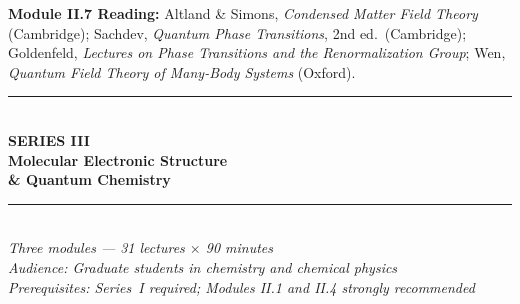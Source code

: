 \documentclass[11pt,a4paper]{article}
\begin{document}
\begin{tcolorbox}[highlightbox]
\textbf{Module II.7 Reading:}
Altland \& Simons, \textit{Condensed Matter Field Theory} (Cambridge);
Sachdev, \textit{Quantum Phase Transitions}, 2nd ed.\ (Cambridge);
Goldenfeld, \textit{Lectures on Phase Transitions and the Renormalization Group};
Wen, \textit{Quantum Field Theory of Many-Body Systems} (Oxford).
\end{tcolorbox}

\newpage

\newpage
\thispagestyle{empty}
\pagecolor{darkblue}
\color{white}
\vspace*{2.2cm}
\begin{center}
  {\color{accentgold}\rule{11cm}{1.5pt}}\\[0.5cm]
  {\fontsize{11}{14}\selectfont\bfseries\color{accentgold}\MakeUppercase{Series III}}\\[0.3cm]
  {\fontsize{22}{28}\selectfont\bfseries Molecular Electronic Structure}\\[0.2cm]
  {\fontsize{22}{28}\selectfont\bfseries \& Quantum Chemistry}\\[0.4cm]
  {\color{accentgold}\rule{11cm}{1.5pt}}\\[1.0cm]
  {\large\itshape Three modules --- 31 lectures $\times$ 90 minutes}\\[0.5cm]
  {\normalsize\itshape Audience: Graduate students in chemistry and chemical physics}\\[0.3cm]
  {\normalsize\itshape Prerequisites: Series~I required; Modules II.1 and II.4 strongly recommended}\\[1.6cm]


\end{center}
\end{document}
